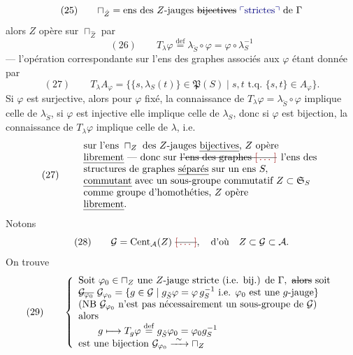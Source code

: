 \documentclass[11pt,a4paper]{article}
\begin{document}
\[
(25) \qquad \sqcap_{\hat{Z}} = \text{ens des $Z$-jauges \struck{bijectives} \add{strictes} de } \Gamma
\]
alors $Z$ opère sur $\sqcap_{\hat{Z}}$ par
\[
(26) \qquad T_{\lambda} \varphi \overset{\mathrm{def}}{=} \lambda_{\check{S}} \circ \varphi = \varphi \circ \lambda_S^{-1}
\]
--- l'opération correspondante sur l'ens des graphes associés aux $\varphi$ étant donnée par
\[
(27) \qquad T_{\lambda} A_{\varphi} = \{\{s, \lambda_S(t)\} \in \mathfrak{P}(S) \mid s, t \text{ t.q. } \{s,t\} \in A_{\varphi}\} .
\]
Si $\varphi$ est surjective, alors pour $\varphi$ fixé, la connaissance de $T_{\lambda}\varphi = \lambda_{\check{S}} \circ \varphi$ implique celle de $\lambda_{\check{S}}$, si $\varphi$ est injective elle implique celle de $\lambda_S$, donc si $\varphi$ est bijection, la connaissance de $T_{\lambda}\varphi$ implique celle de $\lambda$, i.e. 
\[
(27) \qquad
\begin{array}{l}
\text{sur l'ens } \sqcap_Z \text{ des $Z$-jauges \emph{bijectives}, $Z$ opère} \\
\text{\emph{librement} --- donc sur \struck{l'ens des graphes \ill{}} l'ens des} \\
\text{structures de graphes \emph{séparés} sur un ens } S, \\
\text{\emph{commutant} avec un sous-groupe commutatif } Z \subset \mathfrak{S}_S \\
\text{comme groupe d'homothéties, } Z \text{ opère} \\
\text{\emph{librement}.}
\end{array}
\]
Notons
\[
(28) \qquad \mathcal{G} = \mathrm{Cent}_{\mathcal{A}}(Z) \text{ \struck{\ill{}}}, \quad \text{d'où} \quad Z \subset \mathcal{G} \subset \mathcal{A} .
\]
On trouve
\[
(29) \qquad
\left\{
\begin{array}{l}
\text{Soit } \varphi_0 \in \sqcap_Z \text{ une $Z$-jauge stricte (i.e. bij.) de } \Gamma, \ \text{\struck{alors}} \text{ soit} \\
\text{\struck{$\mathcal{G}_{\varphi_0}$}} \ \mathcal{G}_{\varphi_0} = \{g \in \mathcal{G} \mid g_{\check{S}} \varphi = \varphi\, g_S^{-1} \text{ i.e. } \varphi_0 \text{ est une $g$-jauge}\} \\
\text{(NB } \mathcal{G}_{\varphi_0} \text{ n'est pas nécessairement un sous-groupe de } \mathcal{G}) \\
\text{alors} \\
\qquad g \longmapsto T_g \varphi \overset{\mathrm{def}}{=} g_{\check{S}} \varphi_0 = \varphi_0 g_S^{-1} \\
\text{est une bijection } \mathcal{G}_{\varphi_0} \xrightarrow{\ \sim\ } \sqcap_Z
\end{array}
\right.
\]
\end{document}
